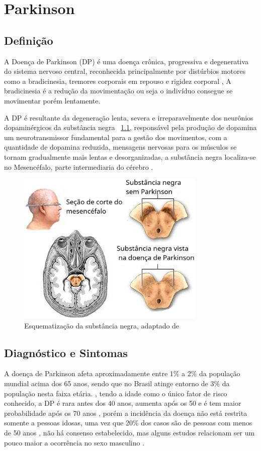 \chapter{Parkinson}
\section{Definição}

A Doença de Parkinson (DP) é uma doença crônica, progressiva e degenerativa do sistema nervoso central, reconhecida principalmente por distúrbios motores como a bradicinesia, tremores corporais em repouso e rigidez corporal \cite{da2016aspectos}, A bradicinesia é a redução da movimentação ou seja o indivíduo consegue se movimentar porém lentamente. 

A DP é resultante da degeneração lenta, severa e irreparavelmente dos neurônios dopaminérgicos da substância negra ~\ref{substanciaNegra}, responsável pela produção de dopamina um neurotransmissor fundamental para a gestão dos movimentos, com a quantidade de dopamina reduzida, mensagens nervosas para os músculos se tornam gradualmente mais lentas e desorganizadas, a substância negra localiza-se no Mesencéfalo, parte intermediaria do cérebro \cite{eftaxias2015detection}.

\begin{figure}[!htb]
	\centering
	\includegraphics[width=0.8\textwidth]{figuras/subNegra.eps}
	\caption{Esquematização da substância negra, adaptado de }
	\label{substanciaNegra}
\end{figure}

\section{Diagnóstico e Sintomas}
A doença de Parkinson afeta aproximadamente entre 1\% a 2\% da população mundial acima dos 65 anos, sendo que no Brasil atinge entorno de 3\% da população nesta faixa etária. \cite{magalhaes2009descobrindo}, tendo a idade como o único fator de risco conhecido, a DP é rara antes dos 40 anos, aumenta após os 50 e é tem maior probabilidade após os 70 anos \cite{peixinho2006alteraccoes}, porém a incidência da doença não está restrita somente a pessoas idosas, uma vez que 20\% dos casos são de pessoas com menos de 50 anos \cite{gago2014manual}, não há consenso estabelecido, mas alguns estudos relacionam ser um pouco maior a ocorrência no sexo masculino \cite{peixinho2006alteraccoes}.

